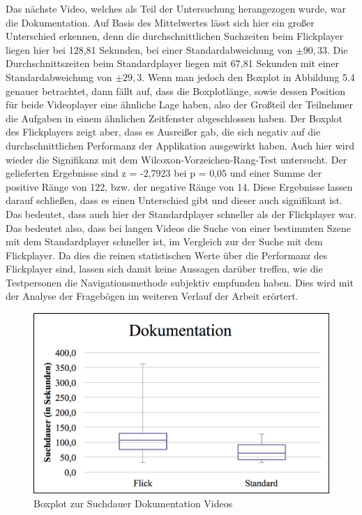 \documentclass[11pt,a4paper]{report}
\begin{document}
Das nächste Video, welches als Teil der Untersuchung herangezogen wurde, war die Dokumentation. Auf Basis des Mittelwertes lässt sich hier ein großer Unterschied erkennen, denn die durchschnittlichen Suchzeiten beim Flickplayer liegen hier bei 128,81 Sekunden, bei einer Standardabweichung von  $\pm 90,33$. Die Durchschnittszeiten beim Standardplayer liegen mit 67,81 Sekunden mit einer Standardabweichung von $\pm 29,3$. Wenn man jedoch den Boxplot in Abbildung 5.4 genauer betrachtet, dann fällt auf, dass die Boxplotlänge, sowie dessen Position für beide Videoplayer eine ähnliche Lage haben, also der Großteil der Teilnehmer die Aufgaben in einem ähnlichen Zeitfenster abgeschlossen haben. Der Boxplot des Flickplayers zeigt aber, dass es Ausreißer gab, die sich negativ auf die durchschnittlichen Performanz der Applikation ausgewirkt haben. Auch hier wird wieder die Signifikanz mit dem Wilcoxon-Vorzeichen-Rang-Test untersucht. Der gelieferten Ergebnisse sind z = -2,7923 bei p = 0,05 und einer Summe der positive Ränge von 122, bzw. der negative Ränge von 14. Diese Ergebnisse lassen darauf schließen, dass es einen Unterschied gibt und dieser auch signifikant ist. Das bedeutet, dass auch hier der Standardplayer schneller als der Flickplayer war. Das bedeutet also, dass bei langen Videos die Suche von einer bestimmten Szene mit dem Standardplayer schneller ist, im Vergleich zur der Suche mit dem Flickplayer. Da dies die reinen statistischen Werte über die Performanz des Flickplayer sind, lassen sich damit keine Aussagen darüber treffen, wie die Testpersonen die Navigationsmethode subjektiv empfunden haben. Dies wird mit der Analyse der Fragebögen im weiteren Verlauf der Arbeit erörtert.
\begin{figure}[h]
\begin{center}
\includegraphics[scale=0.9]{./images/34.png}
\caption{Boxplot zur Suchdauer Dokumentation Videos}
\label{boxplot_dokumentation}
\end{center}
\end{figure}
\end{document}
